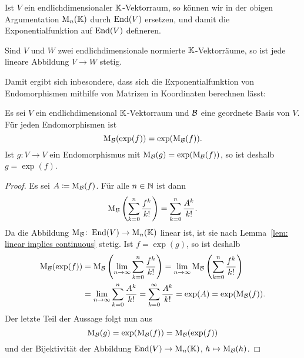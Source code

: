 \documentclass[a4paper, 10pt]{article}
\begin{document}
Ist $V$ ein endlichdimensionaler $\mathbb{K}$-Vektorraum, so können wir in der obigen Argumentation $\operatorname{M}_n(\mathbb{K})$ durch $\operatorname{End}(V)$ ersetzen, und damit die Exponentialfunktion auf $\operatorname{End}(V)$ defineren.

\begin{lemma}\label{lem: linear implies continuous}
  Sind $V$ und $W$ zwei endlichdimensionale normierte $\mathbb{K}$-Vektorräume, so ist jede lineare Abbildung $V \to W$ stetig.
\end{lemma}

Damit ergibt sich inbesondere, dass sich die Exponentialfunktion von Endomorphismen mithilfe von Matrizen in Koordinaten berechnen lässt:

\begin{corollary}\label{cor: exponential in coordinates}
  Es sei $V$ ein endlichdimensional $\mathbb{K}$-Vektorraum und $\mathcal{B}$ eine geordnete Basis von $V$.
  Für jeden Endomorphismen ist
  \[
    \operatorname{M}_{\mathcal{B}}( \exp(f) ) = \exp( \operatorname{M}_{\mathcal{B}}(f) ).
  \]
  Ist $g \colon V \to V$ ein Endomorphismus mit $\operatorname{M}_{\mathcal{B}}(g) = \exp(\operatorname{M}_{\mathcal{B}}(f))$, so ist deshalb $g = \exp(f)$.
\end{corollary}

\begin{proof}
  Es sei $A \coloneqq \operatorname{M}_{\mathcal{B}}(f)$.
  Für alle $n \in \mathbb{N}$ ist dann
  \[
      \operatorname{M}_{\mathcal{B}}\left( \sum_{k=0}^n \frac{f^k}{k!} \right)
    = \sum_{k=0}^n \frac{A^k}{k!}.
  \]
  Da die Abbildung $\operatorname{M}_{\mathcal{B}} \colon \operatorname{End}(V) \to \operatorname{M}_n(\mathbb{K})$ linear ist, ist sie nach Lemma~\ref{lem: linear implies continuous} stetig.
  Ist $f = \exp(g)$, so ist deshalb
  \begin{align*}
        \operatorname{M}_{\mathcal{B}}( \exp(f) )
    &=  \operatorname{M}_{\mathcal{B}}\left( \lim_{n \to \infty} \sum_{k=0}^n \frac{f^k}{k!} \right)
     =  \lim_{n \to \infty} \operatorname{M}_{\mathcal{B}}\left( \sum_{k=0}^n \frac{f^k}{k!} \right) \\
    &=  \lim_{n \to \infty} \sum_{k=0}^n \frac{A^k}{k!}
     =  \sum_{k=0}^\infty \frac{A^k}{k!}
     =  \exp(A)
     =  \exp( \operatorname{M}_{\mathcal{B}}(f) ).
  \end{align*}
  Der letzte Teil der Aussage folgt nun aus
  \[
      \operatorname{M}_{\mathcal{B}}(g)
    = \exp( \operatorname{M}_{\mathcal{B}}(f) )
    = \operatorname{M}_{\mathcal{B}}( \exp(f) )
  \]
  und der Bijektivität der Abbildung $\operatorname{End}(V) \to \operatorname{M}_n(\mathbb{K})$, $h \mapsto \operatorname{M}_{\mathcal{B}}(h)$.
\end{proof}
\end{document}
